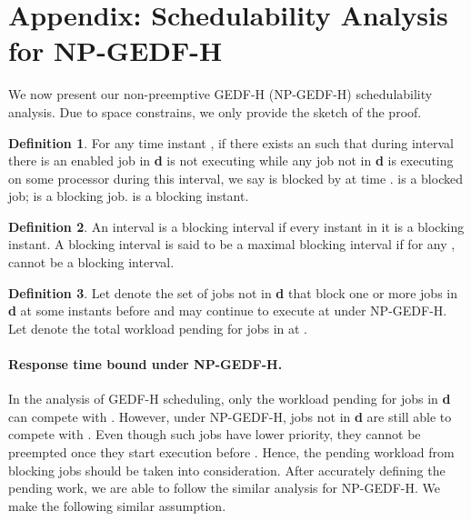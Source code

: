 \documentclass[Times, 10pt,twocolumn]{article}
\theoremstyle{definition}
\newtheorem{definition}{\textbf{Definition}}
\begin{document}
\begin{spacing}{0.1}
 

\end{spacing}

\vspace{-1mm}
\section*{Appendix: Schedulability Analysis for NP-GEDF-H}
\label{sec:NP-EDF}

We now present our non-preemptive GEDF-H (NP-GEDF-H) schedulability analysis. Due to space constrains, we only provide the sketch of the proof.

\begin{definition}
\label{def:block job*}
For any time instant , if there exists an  such that during interval  there is an enabled job  in \textbf{d} is not executing while any job  not in \textbf{d} is executing on some processor during this interval, we say  is blocked by  at time .  is a blocked job;  is a blocking job.  is a blocking instant.
\end{definition}

\begin{definition}
\label{def:block interval*}
An interval  is a blocking interval if every instant in it is a blocking instant. A blocking interval is said to be a maximal blocking interval if for any ,  cannot be a blocking interval.
\end{definition}
 
\begin{definition}
\label{def:BIG B*}
Let  denote the set of jobs not in \textbf{d} that block one or more jobs in \textbf{d} at some instants before  and may continue to execute at  under NP-GEDF-H. Let  denote the total workload pending for jobs in  at . 
\end{definition}

\paragraph{Response time bound under NP-GEDF-H.} In the analysis of GEDF-H scheduling, only the workload pending for jobs in \textbf{d} can compete with . However, under NP-GEDF-H, jobs not in \textbf{d} are still able to compete with . Even though such jobs have lower priority, they cannot be preempted once they start execution before . Hence, the pending workload from blocking jobs should be taken into consideration. After accurately defining the pending work, we are able to follow the similar analysis for NP-GEDF-H. We make the following similar assumption.
\end{document}

